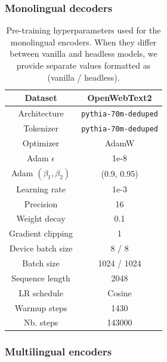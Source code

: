 \subsubsection{Monolingual decoders}
\label{app:train_mono_dec}
\begin{table}[H]
\centering
\small
\begin{tabular}{c|c}
\toprule
Dataset & OpenWebText2  \\ \hline
Architecture & \texttt{pythia-70m-deduped} \\ \hline
Tokenizer & \texttt{pythia-70m-deduped} \\ \hline
Optimizer         & AdamW      \\ \hline
Adam $\epsilon$ & 1e-8   \\ \hline
Adam $(\beta_1, \beta_2)$ & (0.9, 0.95)   \\ \hline
Learning rate     & 1e-3       \\ \hline
Precision  & 16 \\ \hline
Weight decay      & 0.1       \\ \hline
Gradient clipping & 1          \\ \hline
Device batch size        & 8 / 8         \\ \hline
Batch size        & 1024 / 1024         \\ \hline
Sequence length   & 2048        \\ \hline
LR schedule       & Cosine \\ \hline
Warmup steps      & 1430      \\ \hline
Nb. steps         & 143000        \\ \bottomrule
\end{tabular}
\caption{Pre-training hyperparameters used for the monolingual encoders. When they differ between vanilla and headless models, we provide separate values formatted as (vanilla / headless).}
\end{table}

\subsubsection{Multilingual encoders}
\label{app:train_multi_enc}


